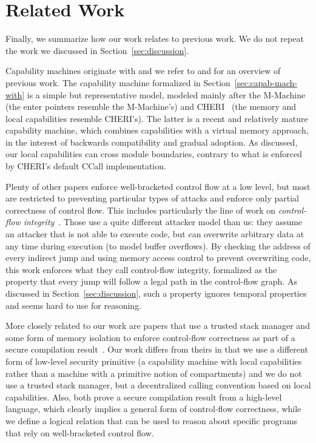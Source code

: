 \documentclass[format=acmsmall, review=true, screen=true]{acmart}
\renewcommand{\sectionname}{Section}
\newcommand\lau[1]{{\color{purple} \sf \footnotesize {LS: #1}}\\}
\renewcommand\lau[1]{}
\newcommand{\itoplassug}[1]{}
\begin{document}
\itoplassug{Reviewer C, popl, would like to know how local capabilities relate to borrowing (see tex comment).}

\section{Related Work}
\label{sec:related-work}

Finally, we summarize how our work relates to previous work. We do not
repeat the work we discussed in \sectionname~\ref{sec:discussion}.

Capability machines originate with \citet{Dennis:1966:PSM:365230.365252} and we refer to \citet{Levy1984capability} and \citet{Watson2015Cheri} for an overview
of previous work. The capability machine formalized in
\sectionname~\ref{sec:capab-mach-with} is a simple but representative
model, modeled mainly after the
M-Machine~\citep{Carter:1994:HSF:195473.195579} (the enter pointers
resemble the M-Machine's) and
CHERI~\citep{Watson2015Cheri,Woodruff:2014:CCM:2665671.2665740} (the
memory and local capabilities resemble CHERI's). The latter is a
recent and relatively mature capability machine, which combines
capabilities with a virtual memory approach, in the interest of
backwards compatibility and gradual adoption. As discussed, our local
capabilities can cross module boundaries, 
contrary to what is enforced by CHERI's default CCall implementation.

Plenty of other papers\lau{If there are plenty, then I guess we should cite more
  than one?} enforce well-bracketed control flow at a low level, but most are
restricted to preventing particular types of attacks and enforce only partial
correctness of control flow. This includes particularly the line of work on
\emph{control-flow integrity}~\citep{abadi_control-flow_2005}. Those use a quite
different attacker model than us: they assume an attacker that is not able to
execute code, but can overwrite arbitrary data at any time during execution (to
model buffer overflows). By checking the address of every indirect jump and
using memory access control to prevent overwriting code, this work enforces what
they call control-flow integrity, formalized as the property that every jump
will follow a legal path in the control-flow graph. As discussed in
\sectionname~\ref{sec:discussion}, such a property ignores temporal properties and
seems hard to use for reasoning.

More closely related to our work are papers that use a trusted stack manager and
some form of memory isolation to enforce control-flow correctness as part of a
secure compilation
result~\citep{patrignani_modular_2016-1,juglaret_beyond_2016-1}. Our work
differs from theirs in that we use a different form of low-level security
primitive (a capability machine with local capabilities rather than a machine
with a primitive notion of compartments) and we do not use a trusted stack
manager, but a decentralized calling convention based on local
capabilities. Also, both prove a secure compilation result from a high-level
language, which clearly implies a general form of control-flow correctness,
while we define a logical relation that can be used to reason about
specific programs that rely on well-bracketed control flow.
\end{document}
